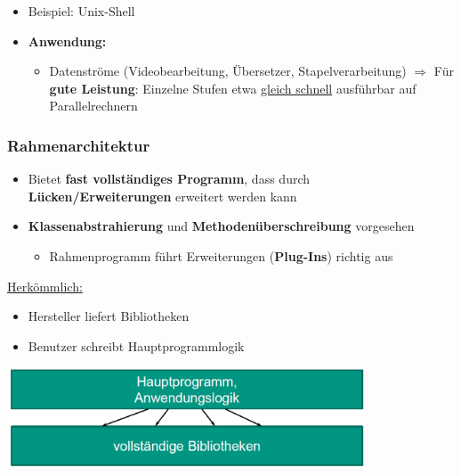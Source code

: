			\begin{itemize}
				\item Beispiel: Unix-Shell
				\item \textbf{Anwendung:}
				\begin{itemize}
					\item Datenströme (Videobearbeitung, Übersetzer, Stapelverarbeitung)
					$\Rightarrow$ Für \textbf{gute Leistung}: Einzelne Stufen etwa \underline{gleich schnell} ausführbar auf Parallelrechnern
				\end{itemize}
			\end{itemize}
			
		\subsubsection{Rahmenarchitektur}
					
			\begin{itemize}
				\item Bietet \textbf{fast vollständiges Programm}, dass durch \textbf{Lücken/Erweiterungen} erweitert werden kann
				\item \textbf{Klassenabstrahierung} und \textbf{Methodenüberschreibung} vorgesehen
				\begin{itemize}
					\item Rahmenprogramm führt Erweiterungen (\textbf{Plug-Ins}) richtig aus
				\end{itemize}
			\end{itemize}
						
			\underline{Herkömmlich:}
			\begin{itemize}
				\item Hersteller liefert Bibliotheken
				\item Benutzer schreibt Hauptprogrammlogik
			\end{itemize}				
			\begin{center}
				\includegraphics[width=0.8\textwidth]{../images/rahmenarchitekturHerkoemmlich.png}
			\end{center}
				
